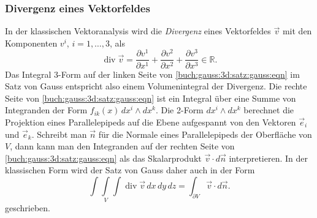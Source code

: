 %
%
\subsubsection{Divergenz eines Vektorfeldes}
In der klassischen Vektoranalysis wird die {\em Divergenz} eines Vektorfeldes
%
$\vec{v}$ mit den Komponenten $v^i$, $i=1,\dots,3$, als
\[
\operatorname{div}\vec{v}
=
\frac{\partial v^1}{\partial x^1}
+
\frac{\partial v^2}{\partial x^2}
+
\frac{\partial v^3}{\partial x^3}
\in
\mathbb{R}.
\]
Das Integral 3-Form auf der linken Seite von
\eqref{buch:gauss:3d:satz:gauss:eqn}
im Satz von Gauss entspricht also einem Volumenintegral
der Divergenz.
%
Die rechte Seite von \eqref{buch:gauss:3d:satz:gauss:eqn}
ist ein Integral über eine Summe von Integranden der Form
$f_{ik}(x)\,dx^i\wedge dx^k$.
Die 2-Form $dx^i\wedge dx^k$ berechnet die Projektion eines
Parallelepipeds auf die Ebene aufgespannt von den Vektoren
$\vec{e}_i$ und $\vec{e}_k$.
Schreibt man $\vec{n}$ für die Normale eines Parallelepipeds
der Oberfläche von $V$, dann kann man den Integranden
%
auf der rechten Seite von \eqref{buch:gauss:3d:satz:gauss:eqn}
als das Skalarprodukt $\vec{v}\cdot d\vec{n}$ interpretieren.
In der klassischen Form wird der Satz von Gauss daher auch
in der Form
\[
\underset{V}{\int\!\!\!\int\!\!\!\int}
\operatorname{div}\vec{v}
\,dx\,dy\,dz
=
\int_{\partial V}\vec{v}\cdot d\vec{n}.
\]
geschrieben.

